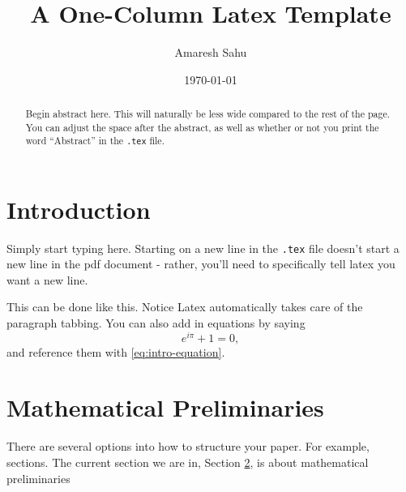 \documentclass[11pt,notitlepage]{article}
\title{\bfseries{\Large{\sffamily A One-Column Latex Template}}}
\author{\large{\sffamily Amaresh Sahu}}
\date{\normalsize \sffamily \today}
\begin{document}
\thispagestyle{empty}



%
%

\maketitle



%
%

\renewcommand{\abstractname}{}
\begin{abstract} \sffamily
	Begin abstract here.
	This will naturally be less wide compared to the rest of the page.
	You can adjust the space after the abstract, as well as whether or not you print the word ``Abstract'' in the \verb+.tex+ file.
	\vspace{20pt}
\end{abstract}



%
%

\section{Introduction}

Simply start typing here.
Starting on a new line in the \verb+.tex+ file doesn't start a new line in the pdf document - rather, you'll need to specifically tell latex you want a new line.
\bigskip

This can be done like this.
Notice Latex automatically takes care of the paragraph tabbing.
You can also add in equations by saying
\begin{equation} \label{eq:intro-equation}
	e^{i\pi} + 1 = 0,
\end{equation}
and reference them with \eqref{eq:intro-equation}.



%
%

\section{Mathematical Preliminaries} \label{sec:math-prelims}

There are several options into how to structure your paper.
For example, sections.
The current section we are in, Section \ref{sec:math-prelims}, is about mathematical preliminaries



%
%
\end{document}
